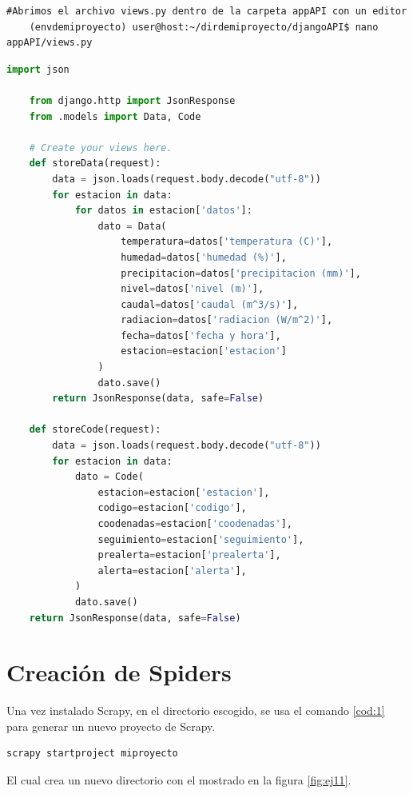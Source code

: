 \begin{lstlisting}[caption={Instrucción por consola para abrir el fichero views.py dentro de la carpeta de la app en un editor de texto}, label=cod:101]
	#Abrimos el archivo views.py dentro de la carpeta appAPI con un editor
	(envdemiproyecto) user@host:~/dirdemiproyecto/djangoAPI$ nano appAPI/views.py
\end{lstlisting}

\begin{lstlisting}[language=Python, caption={Definición funciones de recepción y almacenamiento de datos API}, label=cod:102]
	import json
	
	from django.http import JsonResponse
	from .models import Data, Code
	
	# Create your views here.
	def storeData(request):
		data = json.loads(request.body.decode("utf-8"))
		for estacion in data:
			for datos in estacion['datos']:
				dato = Data(
					temperatura=datos['temperatura (C)'],
					humedad=datos['humedad (%)'],
					precipitacion=datos['precipitacion (mm)'],
					nivel=datos['nivel (m)'],
					caudal=datos['caudal (m^3/s)'],
					radiacion=datos['radiacion (W/m^2)'],
					fecha=datos['fecha y hora'],
					estacion=estacion['estacion']
				)
				dato.save()
		return JsonResponse(data, safe=False)
	
	def storeCode(request):
		data = json.loads(request.body.decode("utf-8"))
		for estacion in data:
			dato = Code(
				estacion=estacion['estacion'],
				codigo=estacion['codigo'],
				coodenadas=estacion['coodenadas'],
				seguimiento=estacion['seguimiento'],
				prealerta=estacion['prealerta'],
				alerta=estacion['alerta'],
			)
			dato.save()
	return JsonResponse(data, safe=False)
\end{lstlisting}

\section{Creación de Spiders}
Una vez instalado Scrapy, en el directorio escogido, se usa el comando \ref{cod:1} para generar un nuevo proyecto de Scrapy.

\begin{lstlisting}[caption={Instrucciones de consola en Linux para la creación de un proyecto scrapy}, label=cod:1]
	scrapy startproject miproyecto
\end{lstlisting}

El cual crea un nuevo directorio con el mostrado en la figura \ref{fig:ej11}.

